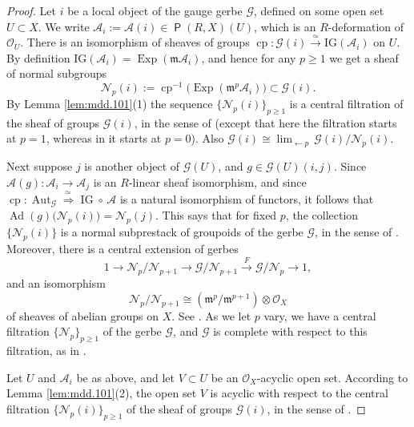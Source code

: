 \documentclass[a4paper, 10pt]{amsart}
\theoremstyle{definition}
\numberwithin{equation}{section}
\newcommand{\iso}{\xrightarrow{\simeq}}
\newcommand{\xar}{\xrightarrow}
\newcommand{\opn}{\operatorname}
\newcommand{\cat}[1]{\operatorname{\mathsf{#1}}}
\newcommand{\mfrak}[1]{\mathfrak{#1}}
\newcommand{\mcal}[1]{\mathcal{#1}}
\newcommand{\mrm}[1]{\mathrm{#1}}
\newcommand{\bsym}[1]{\boldsymbol{#1}}
\newcommand{\ot}{\otimes}
\newcommand{\m}{\mfrak{m}}
\newcommand{\twoiso}{\stackrel{\simeq\ }{\Longrightarrow}}
\newcommand{\gerbe}[1]{\bsym{\mcal{#1}}}
\newcommand{\twocat}[1]{\operatorname{\bsym{\cat{#1}}}}
\begin{document}
\begin{proof}
Let $i$ be a local object of the gauge gerbe $\gerbe{G}$, defined on
some open set $U \subset X$.
We write $\mcal{A}_i := \gerbe{A}(i) \in \twocat{P}(R, X)(U)$, which is
an $R$-deformation of $\mcal{O}_{U}$.
There is an isomorphism of sheaves of groups 
$\opn{cp}: \gerbe{G}(i) \iso \mrm{IG}(\mcal{A}_i)$ on $U$.
By definition 
$\mrm{IG}(\mcal{A}_i) = \opn{Exp}(\m \mcal{A}_i)$, and 
hence for any $p \geq 1$ we get a sheaf of normal subgroups
\[ \gerbe{N}_p(i) := \opn{cp}^{-1}
\bigl( \opn{Exp}(\m^{p} \mcal{A}_i) \bigr) \subset \gerbe{G}(i) . \]
By Lemma \ref{lem:mdd.101}(1) the sequence $\{ \gerbe{N}_p(i) \}_{p \geq 1}$
is a central filtration of the sheaf of groups $\gerbe{G}(i)$, in the sense
of \cite[Definition 6.1]{Ye4}
(except that here the filtration starts at $p = 1$,
whereas in \cite{Ye4} it starts at $p = 0$). Also  
$\gerbe{G}(i) \cong 
\lim_{\leftarrow p}\, \gerbe{G}(i) / \gerbe{N}_p(i)$.

Next suppose $j$ is another object of $\gerbe{G}(U)$, and
$g \in \gerbe{G}(U)(i, j)$. Since 
$\gerbe{A}(g) : \mcal{A}_i \to \mcal{A}_j$ 
is an $R$-linear sheaf isomorphism, and since 
$\opn{cp} : \opn{Aut}_{\gerbe{G}} \twoiso \opn{IG} \circ \, \gerbe{A}$
is a natural isomorphism of functors, it follows that 
$\opn{Ad}(g) \bigl( \gerbe{N}_p(i) \bigr) = 
\gerbe{N}_p(j)$. 
This says that for fixed $p$, the collection 
$\{ \gerbe{N}_p(i) \}$
is a normal subprestack of groupoids of the gerbe $\gerbe{G}$, in the
sense of \cite[Definition 3.6]{Ye4}.
Moreover, there is a central extension of gerbes
\begin{equation} \label{eqn:19}
1 \to \gerbe{N}_p / \gerbe{N}_{p+1} \to 
\gerbe{G} / \gerbe{N}_{p+1} \xar{F}
\gerbe{G} / \gerbe{N}_{p} \to 1 , 
\end{equation}
and an isomorphism
\[ \gerbe{N}_p / \gerbe{N}_{p+1} \cong 
(\m^{p} / \m^{p+1}) \ot \mcal{O}_X  \]
 of sheaves of abelian groups on $X$.
See \cite[Definition 3.10]{Ye4}.
As we let $p$ vary, we have a central filtration
$\{ \gerbe{N}_p \}_{p \geq 1}$ of the gerbe $\gerbe{G}$, and $\gerbe{G}$ is
complete with respect to this filtration, as in 
\cite[Definition 6.5]{Ye4}.

Let $U$ and $\mcal{A}_i$ be as above, and let $V \subset U$ be an
$\mcal{O}_X$-acyclic open set. 
According to Lemma \ref{lem:mdd.101}(2), the open set $V$ is acyclic with
respect to the central filtration 
$\{ \gerbe{N}_p(i) \}_{p \geq 1}$
of the sheaf of groups $\gerbe{G}(i)$, in the sense of
\cite[Definition 6.2]{Ye4}.


\end{proof}
\end{document}
